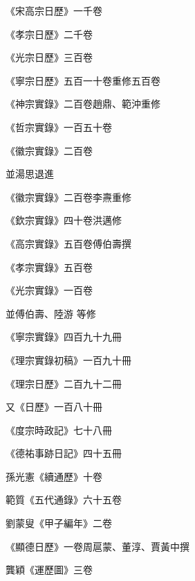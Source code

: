 \begin{pinyinscope}
 《宋高宗日歷》一千卷



 《孝宗日歷》二千卷



 《光宗日歷》三百卷



 《寧宗日歷》五百一十卷重修五百卷



 《神宗實錄》二百卷趙鼎、範沖重修



 《哲宗實錄》一百五十卷



 《徽宗實錄》二百卷



 並湯思退進



 《徽宗實錄》二百卷李燾重修



 《欽宗實錄》四十卷洪邁修



 《高宗實錄》五百卷傅伯壽撰



 《孝宗實錄》五百卷



 《光宗實錄》一百卷



 並傅伯壽、陸游
 等修



 《寧宗實錄》四百九十九冊



 《理宗實錄初稿》一百九十冊



 《理宗日歷》二百九十二冊



 又《日歷》一百八十冊



 《度宗時政記》七十八冊



 《德祐事跡日記》四十五冊



 孫光憲《續通歷》十卷



 範質《五代通錄》六十五卷



 劉蒙叟《甲子編年》二卷



 《顯德日歷》一卷周扈蒙、董淳、賈黃中撰



 龔穎《運歷圖》三卷




\end{pinyinscope}
